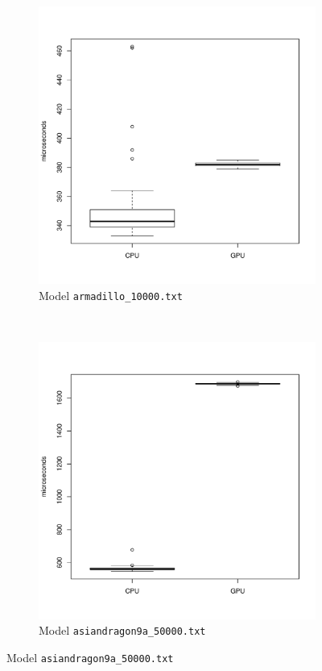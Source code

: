 	\begin{figure}
		\centering
		\begin{subfigure}[b]{0.45\textwidth}
			\includegraphics[width=\textwidth]{results/armadillo}
			\caption{Model \texttt{armadillo_10000.txt}}
		\end{subfigure}
		~%
		\begin{subfigure}[b]{0.45\textwidth}
			\includegraphics[width=\textwidth]{results/asiandragon9a_50000}
			\caption{Model \texttt{asiandragon9a\_50000.txt}}
		\end{subfigure}
		

\end{figure}

